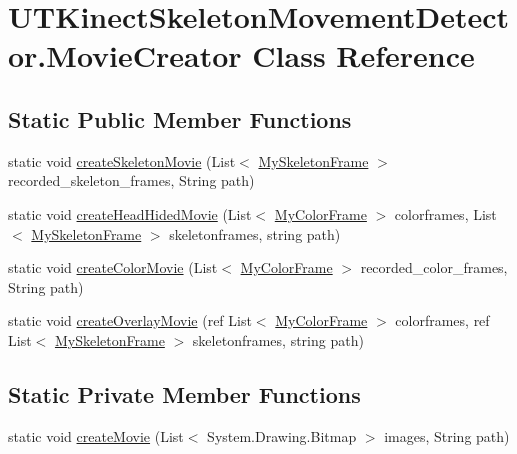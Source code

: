 \hypertarget{classUTKinectSkeletonMovementDetector_1_1MovieCreator}{\section{U\-T\-Kinect\-Skeleton\-Movement\-Detector.\-Movie\-Creator Class Reference}
\label{classUTKinectSkeletonMovementDetector_1_1MovieCreator}
}
\subsection*{Static Public Member Functions}
\begin{DoxyCompactItemize}
\item 
static void \hyperlink{classUTKinectSkeletonMovementDetector_1_1MovieCreator_aafc8c8982e0970d2821bf25b0ce8e565}{create\-Skeleton\-Movie} (List$<$ \hyperlink{classUTKinectSkeletonMovementDetector_1_1MySkeletonFrame}{My\-Skeleton\-Frame} $>$ recorded\-\_\-skeleton\-\_\-frames, String path)
\item 
static void \hyperlink{classUTKinectSkeletonMovementDetector_1_1MovieCreator_a36477a3256e44e8b5d2ccf5f327ecfc5}{create\-Head\-Hided\-Movie} (List$<$ \hyperlink{classUTKinectSkeletonMovementDetector_1_1MyColorFrame}{My\-Color\-Frame} $>$ colorframes, List$<$ \hyperlink{classUTKinectSkeletonMovementDetector_1_1MySkeletonFrame}{My\-Skeleton\-Frame} $>$ skeletonframes, string path)
\item 
static void \hyperlink{classUTKinectSkeletonMovementDetector_1_1MovieCreator_a7fd66211d625f35e484a48f97c90f99d}{create\-Color\-Movie} (List$<$ \hyperlink{classUTKinectSkeletonMovementDetector_1_1MyColorFrame}{My\-Color\-Frame} $>$ recorded\-\_\-color\-\_\-frames, String path)
\item 
static void \hyperlink{classUTKinectSkeletonMovementDetector_1_1MovieCreator_a8d05c98c086701159a6741eba4b04b80}{create\-Overlay\-Movie} (ref List$<$ \hyperlink{classUTKinectSkeletonMovementDetector_1_1MyColorFrame}{My\-Color\-Frame} $>$ colorframes, ref List$<$ \hyperlink{classUTKinectSkeletonMovementDetector_1_1MySkeletonFrame}{My\-Skeleton\-Frame} $>$ skeletonframes, string path)
\end{DoxyCompactItemize}
\subsection*{Static Private Member Functions}
\begin{DoxyCompactItemize}
\item 
static void \hyperlink{classUTKinectSkeletonMovementDetector_1_1MovieCreator_aeffcfd490d691f74541c9426fb6eb2fe}{create\-Movie} (List$<$ System.\-Drawing.\-Bitmap $>$ images, String path)
\end{DoxyCompactItemize}


